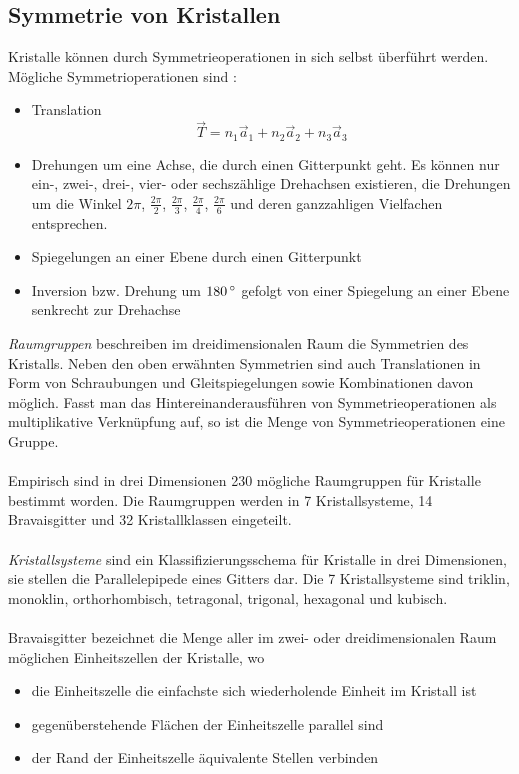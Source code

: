 \documentclass[a4paper,titlepage]{scrartcl}
\numberwithin{equation}{section}
\begin{document}
\subsection{Symmetrie von Kristallen}
Kristalle können durch Symmetrieoperationen in sich selbst überführt werden. Mögliche Symmetrioperationen sind \cite{kittel}:
\begin{itemize}
\item Translation
\begin{equation*}
\vec{T}=n_1\vec{a}_1+n_2\vec{a}_2+n_3\vec{a}_3
\end{equation*}
\item Drehungen um eine Achse, die durch einen Gitterpunkt geht. Es können nur ein-, zwei-, drei-, vier- oder sechszählige Drehachsen existieren, die Drehungen um die Winkel $2\pi$, $\frac{2\pi}{2}$, $\frac{2\pi}{3}$, $\frac{2\pi}{4}$, $\frac{2\pi}{6}$ und deren ganzzahligen Vielfachen entsprechen.
\item Spiegelungen an einer Ebene durch einen Gitterpunkt
\item Inversion bzw. Drehung um $\unit[180]{^\circ}$ gefolgt von einer Spiegelung an einer Ebene senkrecht zur Drehachse
\end{itemize}
\emph{Raumgruppen} beschreiben im dreidimensionalen Raum die Symmetrien des Kristalls. Neben den oben erwähnten Symmetrien sind auch Translationen in Form von Schraubungen und Gleitspiegelungen sowie Kombinationen davon möglich. Fasst man das Hintereinanderausführen von Symmetrieoperationen als multiplikative Verknüpfung auf, so ist die Menge von Symmetrieoperationen eine Gruppe. \\ \\
Empirisch sind in drei Dimensionen 230 mögliche Raumgruppen für Kristalle bestimmt worden. Die Raumgruppen werden in 7 Kristallsysteme, 14 Bravaisgitter und 32 Kristallklassen eingeteilt. \cite{wiki:raumgruppe} \\ \\
\emph{Kristallsysteme} sind ein Klassifizierungsschema für Kristalle in drei Dimensionen, sie stellen die Parallelepipede eines Gitters dar. Die 7 Kristallsysteme sind triklin, monoklin, orthorhombisch, tetragonal, trigonal, hexagonal und kubisch.\\ \\
Bravaisgitter bezeichnet die Menge aller im zwei- oder dreidimensionalen Raum möglichen Einheitszellen der Kristalle, wo
\begin{itemize}
\item die Einheitszelle die einfachste sich wiederholende Einheit im Kristall ist
\item gegenüberstehende Flächen der Einheitszelle parallel sind
\item der Rand der Einheitszelle äquivalente Stellen verbinden
\end{itemize}
\end{document}
